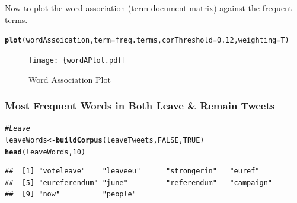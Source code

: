 \documentclass[10pt  ,usenames, dvipsnames]{article}\usepackage[]{graphicx}\usepackage[]{color}
\makeatletter
\newcommand{\hlnum}[1]{\textcolor[rgb]{0.686,0.059,0.569}{#1}}%
\newcommand{\hlcom}[1]{\textcolor[rgb]{0.678,0.584,0.686}{\textit{#1}}}%
\newcommand{\hlstd}[1]{\textcolor[rgb]{0.345,0.345,0.345}{#1}}%
\newcommand{\hlkwb}[1]{\textcolor[rgb]{0.69,0.353,0.396}{#1}}%
\newcommand{\hlkwc}[1]{\textcolor[rgb]{0.333,0.667,0.333}{#1}}%
\newcommand{\hlkwd}[1]{\textcolor[rgb]{0.737,0.353,0.396}{\textbf{#1}}}%
\newenvironment{kframe}{%
 \def\at@end@of@kframe{}%
 \ifinner\ifhmode%
  \def\at@end@of@kframe{\end{minipage}}%
  \begin{minipage}{\columnwidth}%
 \fi\fi%
 \def\FrameCommand##1{\hskip\@totalleftmargin \hskip-\fboxsep
 \colorbox{shadecolor}{##1}\hskip-\fboxsep
     \hskip-\linewidth \hskip-\@totalleftmargin \hskip\columnwidth}%
 \MakeFramed {\advance\hsize-\width
   \@totalleftmargin\z@ \linewidth\hsize
   \@setminipage}}%
 {\par\unskip\endMakeFramed%
 \at@end@of@kframe}
\newenvironment{knitrout}{}{} %
\makeatother
\begin{document}
Now to plot the word association (term document matrix) against the frequent terms.
\begin{knitrout}
\color{fgcolor}\begin{kframe}
\begin{alltt}
\hlkwd{plot}\hlstd{(wordAssoication,} \hlkwc{term} \hlstd{= freq.terms,} \hlkwc{corThreshold} \hlstd{=} \hlnum{0.12}\hlstd{,} \hlkwc{weighting} \hlstd{= T)}
\end{alltt}
\end{kframe}
\end{knitrout}


\begin{figure}[H]
\begin{center}
\caption {Word Association Plot}
\texttt{[image: \{wordAPlot.pdf]}
\label{fig5}
\end {center}
\end {figure}



% 










\subsubsection{Most Frequent Words in Both Leave \& Remain Tweets}

\begin{knitrout}
\color{fgcolor}\begin{kframe}
\begin{alltt}
\hlcom{#Leave}
\hlstd{leaveWords} \hlkwb{<-} \hlkwd{buildCorpus}\hlstd{(leaveTweets,} \hlnum{FALSE}\hlstd{,}\hlnum{TRUE}\hlstd{)}
\hlkwd{head}\hlstd{(leaveWords,} \hlnum{10}\hlstd{)}
\end{alltt}
\end{kframe}
\end{knitrout}

\begin{knitrout}
\color{fgcolor}\begin{kframe}
\begin{verbatim}
##  [1] "voteleave"    "leaveeu"      "strongerin"   "euref"       
##  [5] "eureferendum" "june"         "referendum"   "campaign"    
##  [9] "now"          "people"
\end{verbatim}
\end{kframe}
\end{knitrout}
\end{document}
